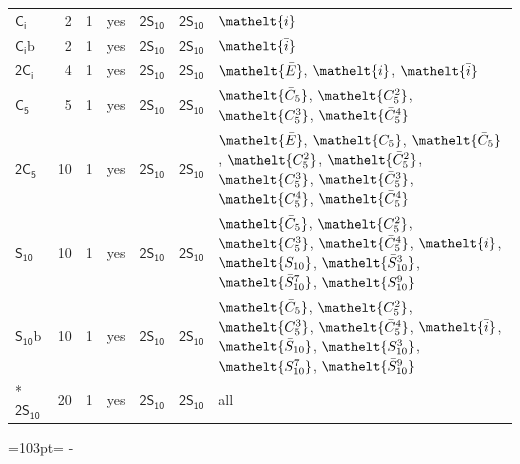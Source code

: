 \documentclass[10pt,a4paper]{article}
\newcommand{\needspace}[1]{\par\penalty-100\begingroup\dimen0=#1\relax\dimen2=\pagegoal
  \advance\dimen2-\pagetotal\ifdim\dimen0>\dimen2\relax\ifdim\dimen2>0pt\vfil\break\fi\fi
  \endgroup}
\numberwithin{equation}{section}
\newcommand{\eltfont}[1]{{\let\sigma\eltsigma\mathelt{#1}}}
\newcommand{\grp}[1]{\mathsf{#1}}
\newcommand{\cls}[1]{\eltfont{#1}}
\newcommand{\barred}[1]{\bar{#1}}
\newcommand{\secondclass}{\mathrm{b}}
\newlength{\fillwidth}\newlength{\cellwidth}\newlength{\colwidth}
\begin{document}
{\begin{longtable}{@{}lrrlll>{\RaggedRight\arraybackslash}p{\fillwidth}@{}}
\href{S2.pdf}{$\grp{C_{i}}$} & 2 & 1 & yes & \href{2S10.pdf}{$\grp{2S_{10}}$} & \href{2S10.pdf}{$\grp{2S_{10}}$} & $\cls{i}$\\
\href{S2b.pdf}{$\grp{C_{i}}\secondclass$} & 2 & 1 & yes & \href{2S10.pdf}{$\grp{2S_{10}}$} & \href{2S10.pdf}{$\grp{2S_{10}}$} & $\cls{\barred{i}}$\\
\href{2S2.pdf}{$\grp{2C_{i}}$} & 4 & 1 & yes & \href{2S10.pdf}{$\grp{2S_{10}}$} & \href{2S10.pdf}{$\grp{2S_{10}}$} & $\cls{\barred{E}}$, $\cls{i}$, $\cls{\barred{i}}$\\
\href{C5.pdf}{$\grp{C_{5}}$} & 5 & 1 & yes & \href{2S10.pdf}{$\grp{2S_{10}}$} & \href{2S10.pdf}{$\grp{2S_{10}}$} & $\cls{\barred{C}_{5}}$, $\cls{C_{5}^{2}}$, $\cls{C_{5}^{3}}$, $\cls{\barred{C}_{5}^{4}}$\\
\href{2C5.pdf}{$\grp{2C_{5}}$} & 10 & 1 & yes & \href{2S10.pdf}{$\grp{2S_{10}}$} & \href{2S10.pdf}{$\grp{2S_{10}}$} & $\cls{\barred{E}}$, $\cls{C_{5}}$, $\cls{\barred{C}_{5}}$, $\cls{C_{5}^{2}}$, $\cls{\barred{C}_{5}^{2}}$, $\cls{C_{5}^{3}}$, $\cls{\barred{C}_{5}^{3}}$, $\cls{C_{5}^{4}}$, $\cls{\barred{C}_{5}^{4}}$\\
\href{S10.pdf}{$\grp{S_{10}}$} & 10 & 1 & yes & \href{2S10.pdf}{$\grp{2S_{10}}$} & \href{2S10.pdf}{$\grp{2S_{10}}$} & $\cls{\barred{C}_{5}}$, $\cls{C_{5}^{2}}$, $\cls{C_{5}^{3}}$, $\cls{\barred{C}_{5}^{4}}$, $\cls{i}$, $\cls{S_{10}}$, $\cls{\barred{S}_{10}^{3}}$, $\cls{\barred{S}_{10}^{7}}$, $\cls{S_{10}^{9}}$\\
\href{S10b.pdf}{$\grp{S_{10}}\secondclass$} & 10 & 1 & yes & \href{2S10.pdf}{$\grp{2S_{10}}$} & \href{2S10.pdf}{$\grp{2S_{10}}$} & $\cls{\barred{C}_{5}}$, $\cls{C_{5}^{2}}$, $\cls{C_{5}^{3}}$, $\cls{\barred{C}_{5}^{4}}$, $\cls{\barred{i}}$, $\cls{\barred{S}_{10}}$, $\cls{S_{10}^{3}}$, $\cls{S_{10}^{7}}$, $\cls{\barred{S}_{10}^{9}}$\\*
\href{2S10.pdf}{$\grp{2S_{10}}$} & 20 & 1 & yes & \href{2S10.pdf}{$\grp{2S_{10}}$} & \href{2S10.pdf}{$\grp{2S_{10}}$} & all\\
\bottomrule\end{longtable}}
\needspace{103pt}
\end{document}
